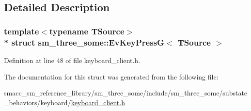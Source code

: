 \subsection{Detailed Description}
\subsubsection*{template$<$typename T\+Source$>$\\*
struct sm\+\_\+three\+\_\+some\+::\+Ev\+Key\+Press\+G$<$ T\+Source $>$}



Definition at line 48 of file keyboard\+\_\+client.\+h.



The documentation for this struct was generated from the following file\+:\begin{DoxyCompactItemize}
\item 
smacc\+\_\+sm\+\_\+reference\+\_\+library/sm\+\_\+three\+\_\+some/include/sm\+\_\+three\+\_\+some/substate\+\_\+behaviors/keyboard/\hyperlink{keyboard__client_8h}{keyboard\+\_\+client.\+h}\end{DoxyCompactItemize}
